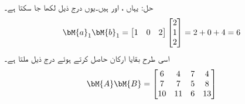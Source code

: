 حل: یہاں ،  اور  ہیں۔یوں درج ذیل لکھا جا سکتا ہے۔
\begin{align*}
\bM{a}_1\bM{b}_1=
\begin{bmatrix}
1&0&2
\end{bmatrix}
\begin{bmatrix}
2\\
1\\
2
\end{bmatrix}=
2+0+4=6
\end{align*}
اسی طرح بقایا ارکان حاصل کرتے ہوئے درج ذیل ملتا ہے۔
\begin{align*}
\bM{A}\bM{B}=
\begin{bmatrix}
6&4&7&4\\
7&7&5&8\\
10&11&6&13
\end{bmatrix}
\end{align*}

